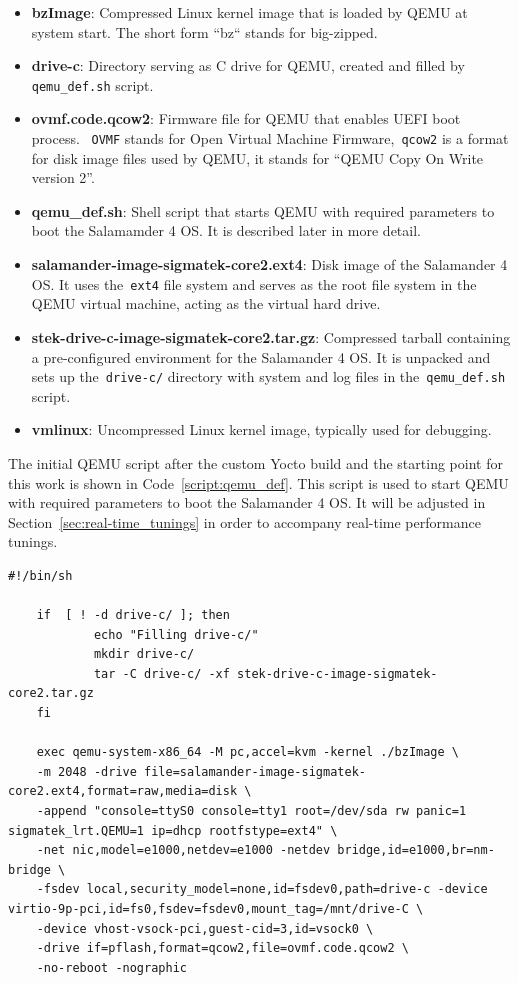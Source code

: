 \documentclass[MMR,Master,english]{style/twbook}
\begin{document}
\begin{itemize}
	\item \textbf{bzImage}: Compressed Linux kernel image that is loaded by QEMU at system start. The short form ``bz`` stands for big-zipped.
	\item \textbf{drive-c}: Directory serving as C drive for QEMU, created and filled by \texttt{qemu\_def.sh} script.
	\item \textbf{ovmf.code.qcow2}: Firmware file for QEMU that enables UEFI boot process. ~\texttt{OVMF} stands for Open Virtual Machine Firmware,~\texttt{qcow2} is a format for disk image files used by QEMU, it stands for ``QEMU Copy On Write version 2''.
	\item \textbf{qemu\_def.sh}: Shell script that starts QEMU with required parameters to boot the Salamamder 4 OS. It is described later in more detail.
	\item \textbf{salamander-image-sigmatek-core2.ext4}: Disk image of the Salamander 4 OS. It uses the~\texttt{ext4} file system and serves as the root file system in the QEMU virtual machine, acting as the virtual hard drive.
	\item \textbf{stek-drive-c-image-sigmatek-core2.tar.gz}: Compressed tarball containing a pre-configured environment for the Salamander 4 OS. It is unpacked and sets up the~\texttt{drive-c/} directory with system and log files in the~\texttt{qemu\_def.sh} script.
	\item \textbf{vmlinux}: Uncompressed Linux kernel image, typically used for debugging.
\end{itemize}

\noindent The initial QEMU script after the custom Yocto build and the starting point for this work is shown in Code~\ref{script:qemu_def}. This script is used to start QEMU with required parameters to boot the Salamander 4 OS. It will be adjusted in Section~\ref{sec:real-time_tunings} in order to accompany real-time performance tunings.

\vspace{2em}
\begin{lstlisting}[name={QEMU Script for starting Salamander 4 Virtualization},label={script:qemu_def}]
	#!/bin/sh

	if  [ ! -d drive-c/ ]; then
			echo "Filling drive-c/"
			mkdir drive-c/
			tar -C drive-c/ -xf stek-drive-c-image-sigmatek-core2.tar.gz
	fi
		
	exec qemu-system-x86_64 -M pc,accel=kvm -kernel ./bzImage \
	-m 2048 -drive file=salamander-image-sigmatek-core2.ext4,format=raw,media=disk \
	-append "console=ttyS0 console=tty1 root=/dev/sda rw panic=1 sigmatek_lrt.QEMU=1 ip=dhcp rootfstype=ext4" \
	-net nic,model=e1000,netdev=e1000 -netdev bridge,id=e1000,br=nm-bridge \
	-fsdev local,security_model=none,id=fsdev0,path=drive-c -device virtio-9p-pci,id=fs0,fsdev=fsdev0,mount_tag=/mnt/drive-C \
	-device vhost-vsock-pci,guest-cid=3,id=vsock0 \
	-drive if=pflash,format=qcow2,file=ovmf.code.qcow2 \
	-no-reboot -nographic
\end{lstlisting}
\vspace{2em}
\end{document}
